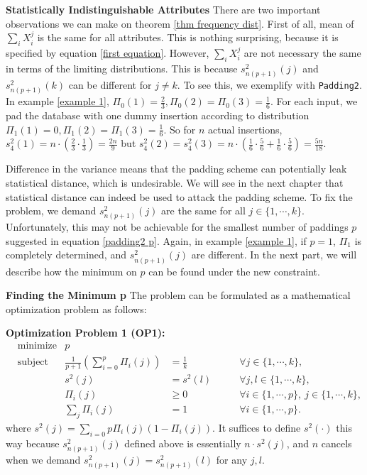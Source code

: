 \documentclass[10pt]{book}
\begin{document}
\textbf{Statistically Indistinguishable Attributes} There are two important observations we can make on theorem \ref{thm frequency dist}. First of all, mean of $\sum_{i} X_i^j$ is the same for all attributes. This is nothing surprising, because it is specified by equation \ref{first equation}. However, $\sum_{i} X_i^j$ are not necessary the same in terms of the limiting distributions. This is because $s_{n(p+1)}^2(j)$ and $s_{n(p+1)}^2(k)$ can be different for $j \neq k$. To see this, we exemplify with \texttt{Padding2}. In example \ref{example 1}, $\Pi_0(1) = \frac{2}{3}, \Pi_0(2) = \Pi_0(3) = \frac{1}{6}$. For each input, we pad the database with one dummy insertion according to distribution $\Pi_1(1) = 0, \Pi_1(2) = \Pi_1(3) = \frac{1}{6}$. So for $n$ actual insertions, $s_4^2(1) = n \cdot (\frac{2}{3} \cdot \frac{1}{3}) = \frac{2n}{9}$ but $s_4^2(2) = s_4^2(3) = n \cdot (\frac{1}{6} \cdot \frac{5}{6} + \frac{1}{6} \cdot \frac{5}{6}) = \frac{5n}{18}$.

Difference in the variance means that the padding scheme can potentially leak statistical distance, which is undesirable. We will see in the next chapter that statistical distance can indeed be used to attack the padding scheme. To fix the problem, we demand $s_{n(p+1)}^2(j)$ are the same for all $j \in \{1, \cdots, k\}$. Unfortunately, this may not be achievable for the smallest number of paddings $p$ suggested in equation \ref{padding2 p}. Again, in example \ref{example 1}, if $p = 1$, $\Pi_1$ is completely determined, and $s_{n(p+1)}^2(j)$ are different. In the next part, we will describe how the minimum on $p$ can be found under the new constraint.


\textbf{Finding the Minimum p} The problem can be formulated as a mathematical optimization problem as follows:

\textbf{Optimization Problem 1 (OP1):}
\begin{equation*}
	\begin{aligned}
		& \text{minimize}    & p 		&&\\
		& \text{subject to}  & \frac{1}{p+1} \left(\sum_{i=0}^{p} \Pi_i(j)\right) & = \frac{1}{k} \qquad &\forall j \in \{1, \cdots, k\}, \\
		& 					 & s^2(j) & = s^2(l) \qquad &\forall j,l \in \{1, \cdots, k\},\\
		& 					 & \Pi_i(j) & \geq 0 \qquad &\forall i \in \{1, \cdots, p\}, \  j \in \{1, \cdots, k\}, \\
		&					 & \sum_{j}\Pi_i(j) & = 1 \qquad &\forall i \in \{1, \cdots, p\}.
	\end{aligned}
\end{equation*}
where $s^2(j) = \sum_{i = 0}{p} \Pi_i(j) (1 - \Pi_i(j))$. It suffices to define $s^2(\cdot)$ this way because $s_{n(p+1)}^2(j)$ defined above is essentially $n \cdot s^2(j)$, and $n$ cancels when we demand $s_{n(p+1)}^2(j) = s_{n(p+1)}^2(l)$ for any $j, l$.
\end{document}
